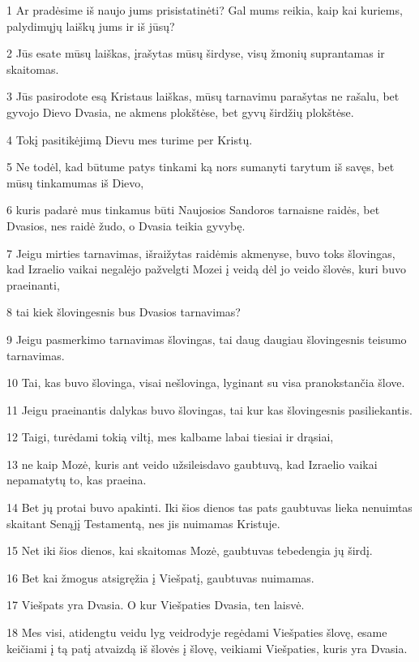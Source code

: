 \par 1 Ar pradėsime iš naujo jums prisistatinėti? Gal mums reikia, kaip kai kuriems, palydimųjų laiškų jums ir iš jūsų? 
\par 2 Jūs esate mūsų laiškas, įrašytas mūsų širdyse, visų žmonių suprantamas ir skaitomas. 
\par 3 Jūs pasirodote esą Kristaus laiškas, mūsų tarnavimu parašytas ne rašalu, bet gyvojo Dievo Dvasia, ne akmens plokštėse, bet gyvų širdžių plokštėse. 
\par 4 Tokį pasitikėjimą Dievu mes turime per Kristų. 
\par 5 Ne todėl, kad būtume patys tinkami ką nors sumanyti tarytum iš savęs, bet mūsų tinkamumas iš Dievo, 
\par 6 kuris padarė mus tinkamus būti Naujosios Sandoros tarnais­ne raidės, bet Dvasios, nes raidė žudo, o Dvasia teikia gyvybę. 
\par 7 Jeigu mirties tarnavimas, išraižytas raidėmis akmenyse, buvo toks šlovingas, kad Izraelio vaikai negalėjo pažvelgti Mozei į veidą dėl jo veido šlovės, kuri buvo praeinanti, 
\par 8 tai kiek šlovingesnis bus Dvasios tarnavimas? 
\par 9 Jeigu pasmerkimo tarnavimas šlovingas, tai daug daugiau šlovingesnis teisumo tarnavimas. 
\par 10 Tai, kas buvo šlovinga, visai nešlovinga, lyginant su visa pranokstančia šlove. 
\par 11 Jeigu praeinantis dalykas buvo šlovingas, tai kur kas šlovingesnis pasiliekantis. 
\par 12 Taigi, turėdami tokią viltį, mes kalbame labai tiesiai ir drąsiai, 
\par 13 ne kaip Mozė, kuris ant veido užsileisdavo gaubtuvą, kad Izraelio vaikai nepamatytų to, kas praeina. 
\par 14 Bet jų protai buvo apakinti. Iki šios dienos tas pats gaubtuvas lieka nenuimtas skaitant Senąjį Testamentą, nes jis nuimamas Kristuje. 
\par 15 Net iki šios dienos, kai skaitomas Mozė, gaubtuvas tebedengia jų širdį. 
\par 16 Bet kai žmogus atsigręžia į Viešpatį, gaubtuvas nuimamas. 
\par 17 Viešpats yra Dvasia. O kur Viešpaties Dvasia, ten laisvė. 
\par 18 Mes visi, atidengtu veidu lyg veidrodyje regėdami Viešpaties šlovę, esame keičiami į tą patį atvaizdą iš šlovės į šlovę, veikiami Viešpaties, kuris yra Dvasia.


